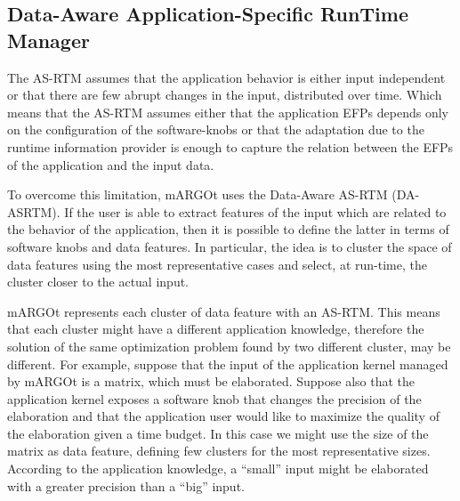 \subsection{Data-Aware Application-Specific RunTime Manager}

The AS-RTM assumes that the application behavior is either input independent or that there are few abrupt changes in the input, distributed over time.
Which means that the AS-RTM assumes either that the application EFPs depends only on the configuration of the software-knobs or that the adaptation due to the runtime information provider is enough to capture the relation between the EFPs of the application and the input data.

To overcome this limitation, mARGOt uses the Data-Aware AS-RTM (DA-ASRTM).
If the user is able to extract features of the input which are related to the behavior of the application, then it is possible to define the latter in terms of software knobs and data features.
In particular, the idea is to cluster the space of data features using the most representative cases and select, at run-time, the cluster closer to the actual input.


mARGOt represents each cluster of data feature with an AS-RTM.
This means that each cluster might have a different application knowledge, therefore the solution of the same optimization problem found by two different cluster, may be different.
For example, suppose that the input of the application kernel managed by mARGOt is a matrix, which must be elaborated.
Suppose also that the application kernel exposes a software knob that changes the precision of the elaboration and that the application user would like to maximize the quality of the elaboration given a time budget.
In this case we might use the size of the matrix as data feature, defining few clusters for the most representative sizes.
According to the application knowledge, a ``small'' input might be elaborated with a greater precision than a ``big'' input.

